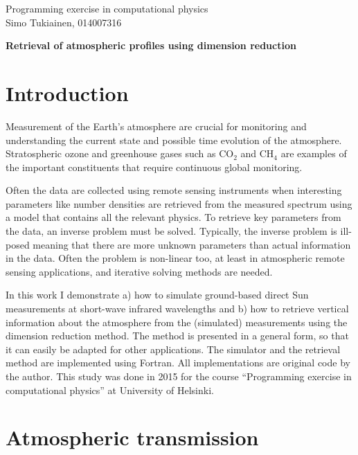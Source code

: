 \documentclass[12pt,a4paper]{article}
\author{Simo Tukiainen}
\begin{document}
\noindent Programming exercise in computational physics \\
\noindent Simo Tukiainen, 014007316 \\

\begin{center}
\LARGE
\textbf{Retrieval of atmospheric profiles using dimension reduction}
\end{center}

\section{Introduction}

Measurement of the Earth's atmosphere are crucial for 
monitoring and understanding the current state and possible 
time evolution of the atmosphere. Stratospheric ozone and
greenhouse gases such as CO$_2$ and CH$_4$ are examples
of the important constituents that require continuous 
global monitoring.

Often the data are collected using remote sensing instruments when
interesting parameters like number densities are retrieved from the 
measured spectrum using a model that contains all the relevant physics.
To retrieve key parameters from the data, an inverse problem
must be solved. Typically, the inverse problem is ill-posed meaning that
there are more unknown parameters than actual information in the data.
Often the problem is non-linear too, at least in atmospheric remote sensing 
applications, and iterative solving methods are needed.

In this work I demonstrate a) how to simulate ground-based direct Sun 
measurements at short-wave infrared wavelengths and b) how to retrieve 
vertical information about the atmosphere from the (simulated) 
measurements using the dimension reduction method. The method is 
presented in a general form, so that it can easily be adapted for other
applications. The simulator and the retrieval method are 
implemented using Fortran. All implementations are original code by the author.
This study was done in 2015 for the course
``Programming exercise in computational physics'' at University of Helsinki.


\section{Atmospheric transmission}
\end{document}
